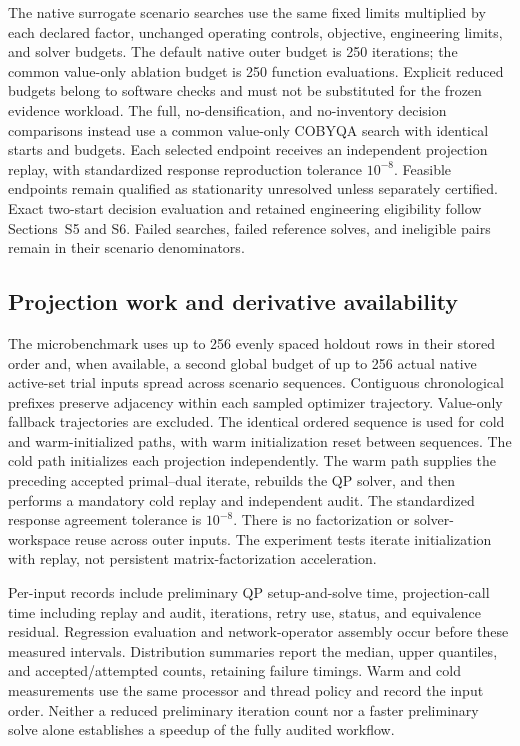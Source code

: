 \documentclass[a4paper,fleqn]{cas-sc}
\begin{document}
The native surrogate scenario searches use the same fixed limits multiplied by each declared factor, unchanged operating controls, objective, engineering limits, and solver budgets. The default native outer budget is 250 iterations; the common value-only ablation budget is 250 function evaluations. Explicit reduced budgets belong to software checks and must not be substituted for the frozen evidence workload. The full, no-densification, and no-inventory decision comparisons instead use a common value-only COBYQA search with identical starts and budgets. Each selected endpoint receives an independent projection replay, with standardized response reproduction tolerance $10^{-8}$. Feasible endpoints remain qualified as stationarity unresolved unless separately certified. Exact two-start decision evaluation and retained engineering eligibility follow Sections~S5 and S6. Failed searches, failed reference solves, and ineligible pairs remain in their scenario denominators.

\subsection{Projection work and derivative availability}

The microbenchmark uses up to 256 evenly spaced holdout rows in their stored order and, when available, a second global budget of up to 256 actual native active-set trial inputs spread across scenario sequences. Contiguous chronological prefixes preserve adjacency within each sampled optimizer trajectory. Value-only fallback trajectories are excluded. The identical ordered sequence is used for cold and warm-initialized paths, with warm initialization reset between sequences. The cold path initializes each projection independently. The warm path supplies the preceding accepted primal--dual iterate, rebuilds the QP solver, and then performs a mandatory cold replay and independent audit. The standardized response agreement tolerance is $10^{-8}$. There is no factorization or solver-workspace reuse across outer inputs. The experiment tests iterate initialization with replay, not persistent matrix-factorization acceleration.

Per-input records include preliminary QP setup-and-solve time, projection-call time including replay and audit, iterations, retry use, status, and equivalence residual. Regression evaluation and network-operator assembly occur before these measured intervals. Distribution summaries report the median, upper quantiles, and accepted/attempted counts, retaining failure timings. Warm and cold measurements use the same processor and thread policy and record the input order. Neither a reduced preliminary iteration count nor a faster preliminary solve alone establishes a speedup of the fully audited workflow.
\end{document}
